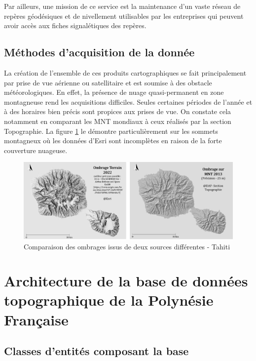 Par ailleurs, une mission de ce service est la maintenance d'un vaste réseau de repères géodésiques et de nivellement utilisables par les entreprises qui peuvent avoir accès aux fiches signalétiques des repères.


\subsection{Méthodes d'acquisition de la donnée}
La création de l'ensemble de ces produits cartographiques se fait principalement par prise de vue aérienne ou satellitaire et est soumise à des obstacle météorologiques. En effet, la présence de nuage quasi-permanent en zone montagneuse rend les acquisitions difficiles. Seules certaines périodes de l'année et à des horaires bien précis sont propices aux prises de vue.  On constate cela notamment en comparant les MNT mondiaux à ceux réalisés par la section Topographie. La figure \ref{ombrage} le démontre particulièrement sur les sommets montagneux où les données d'Esri sont incomplètes en raison de la forte couverture nuageuse.
\begin{figure}[ht]
\centering
\includegraphics[width=\linewidth]{images/chap0/ombrage}
\caption{Comparaison des ombrages issus de deux sources différentes - Tahiti}
\label{ombrage}
\end{figure}

\section{Architecture de la base de données topographique de la Polynésie Française}

\subsection{Classes d'entités composant la base}


